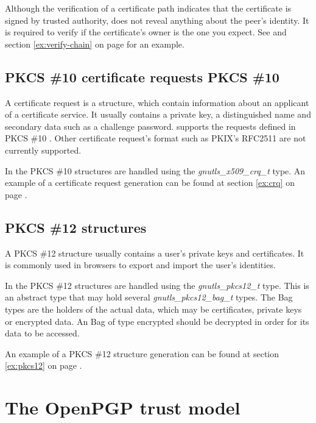 \par
Although the verification of a certificate path indicates that the
certificate is signed by trusted authority, does not reveal anything
about the peer's identity. It is required to verify if the certificate's
owner is the one you expect. See \cite{RFC2818} and section \ref{ex:verify-chain} 
on page \pageref{ex:verify-chain} for an example.


\subsection{PKCS \#10 certificate requests\index
{PKCS \#10}}
A certificate request is a structure, which
contain information about an applicant of a certificate service.
It usually contains a private key, a distinguished name and secondary
data such as a challenge password. \gnutls{} supports the requests
defined in PKCS \#10 \cite{RFC2986}. Other certificate request's format such as
PKIX's RFC2511 \cite{RFC2511} are not currently supported.

In \gnutls{} the PKCS \#10 structures are handled using the
\emph{gnutls\_x509\_crq\_t} type. 
An example of a certificate request generation can be found at section \ref{ex:crq}
on page \pageref{ex:crq}.

\subsection{PKCS \#12 structures}
A PKCS \#12 structure \cite{PKCS12} usually contains a user's private keys and
certificates. It is commonly used in browsers to export and import
the user's identities.
\par
In \gnutls{} the PKCS \#12 structures are handled using the
\emph{gnutls\_pkcs12\_t} type. This is an abstract type that
may hold several \emph{gnutls\_pkcs12\_bag\_t} types. The Bag types are the
holders of the actual data, which may be certificates, private
keys or encrypted data. An Bag of type encrypted should be decrypted
in order for its data to be accessed. 

An example of a PKCS \#12 structure generation can be found at section \ref{ex:pkcs12}
on page \pageref{ex:pkcs12}.

\section{The OpenPGP trust model}
\label{pgp:trust}

